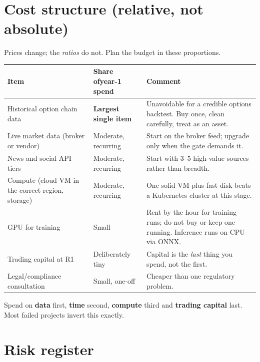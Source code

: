 \section{Cost structure (relative, not absolute)}

Prices change; the \emph{ratios} do not. Plan the budget in these proportions.

\begin{longtable}{@{}p{4.4cm}p{2.6cm}p{7.6cm}@{}}
\toprule
\textbf{Item} & \textbf{Share of\newline year-1 spend} & \textbf{Comment}\\
\midrule
Historical option chain data & \textbf{Largest single item} & Unavoidable for a
credible options backtest. Buy once, clean carefully, treat as an asset.\\
Live market data (broker or vendor) & Moderate, recurring & Start on the broker
feed; upgrade only when the gate demands it.\\
News and social API tiers & Moderate, recurring & Start with 3--5 high-value
sources rather than breadth.\\
Compute (cloud VM in the correct region, storage) & Moderate, recurring & One
solid VM plus fast disk beats a Kubernetes cluster at this stage.\\
GPU for training & Small & Rent by the hour for training runs; do not buy or
keep one running. Inference runs on CPU via ONNX.\\
Trading capital at R1 & Deliberately tiny & Capital is the \emph{last} thing you
spend, not the first.\\
Legal/compliance consultation & Small, one-off & Cheaper than one regulatory
problem.\\
\bottomrule
\end{longtable}

\begin{keybox}[title={Budget principle}]
Spend on \textbf{data} first, \textbf{time} second, \textbf{compute} third and
\textbf{trading capital} last. Most failed projects invert this exactly.
\end{keybox}

\section{Risk register}

